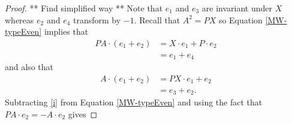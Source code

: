\documentclass[a4paper,reqno]{amsart}
\theoremstyle{definition}
\theoremstyle{remark} \newtheorem{remark}[theorem]{Remark}
\numberwithin{equation}{section}
\begin{document}
\iffalse
\begin{proof} ** Find simplified way **
    Note that \(e_1\) and \(e_3\) are invariant under \(X\) whereas \(e_2\) and \(e_4\) transform by \(-1\). Recall that \(A^2 = PX\) so Equation \ref{MW-typeEven} implies that
    \begin{align} \label{i}
        PA \cdot (e_1 + e_2) &= X \cdot e_1 + P \cdot e_2 \nonumber \\
        &= e_1 + e_4 \tag{i}
    \end{align}
    and also that
    \begin{align} \label{ii}
        A \cdot (e_1 + e_2) &= PX \cdot e_1 + e_2 \nonumber \\
        &= e_3 + e_2. \tag{ii}
    \end{align}
    Subtracting \eqref{i} from Equation \ref{MW-typeEven} and using the fact that \(PA \cdot e_2 = -A\cdot e_2\) gives


\end{proof}
\end{document}
